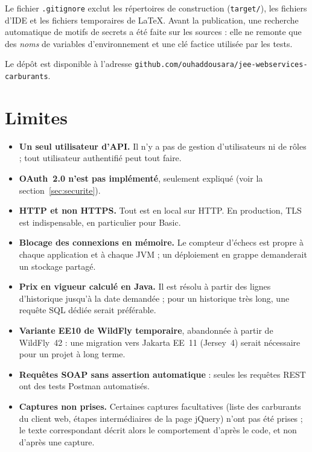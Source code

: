 \documentclass[11pt,a4paper]{article}
\newcommand{\code}[1]{\texttt{#1}}
\begin{document}
Le fichier \code{.gitignore} exclut les répertoires de construction (\code{target/}), les fichiers d'IDE et les fichiers temporaires de LaTeX. Avant la publication, une recherche automatique de motifs de secrets a été faite sur les sources : elle ne remonte que des \emph{noms} de variables d'environnement et une clé factice utilisée par les tests.

Le dépôt est disponible à l'adresse \texttt{github.com/ouhaddousara/jee-webservices-carburants}.

\section{Limites}\label{sec:limites}
\begin{itemize}
  \item \textbf{Un seul utilisateur d'API.} Il n'y a pas de gestion d'utilisateurs ni de rôles ; tout utilisateur authentifié peut tout faire.
  \item \textbf{OAuth~2.0 n'est pas implémenté}, seulement expliqué (voir la section~\ref{sec:securite}).
  \item \textbf{HTTP et non HTTPS.} Tout est en local sur HTTP. En production, TLS est indispensable, en particulier pour Basic.
  \item \textbf{Blocage des connexions en mémoire.} Le compteur d'échecs est propre à chaque application et à chaque JVM ; un déploiement en grappe demanderait un stockage partagé.
  \item \textbf{Prix en vigueur calculé en Java.} Il est résolu à partir des lignes d'historique jusqu'à la date demandée ; pour un historique très long, une requête SQL dédiée serait préférable.
  \item \textbf{Variante EE10 de WildFly temporaire}, abandonnée à partir de WildFly~42 : une migration vers Jakarta EE~11 (Jersey~4) serait nécessaire pour un projet à long terme.
  \item \textbf{Requêtes SOAP sans assertion automatique} : seules les requêtes REST ont des tests Postman automatisés.
  \item \textbf{Captures non prises.} Certaines captures facultatives (liste des carburants du client web, étapes intermédiaires de la page jQuery) n'ont pas été prises ; le texte correspondant décrit alors le comportement d'après le code, et non d'après une capture.
\end{itemize}
\end{document}
